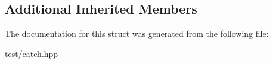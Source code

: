 \subsection*{Additional Inherited Members}


The documentation for this struct was generated from the following file\+:\begin{DoxyCompactItemize}
\item 
test/catch.\+hpp\end{DoxyCompactItemize}
